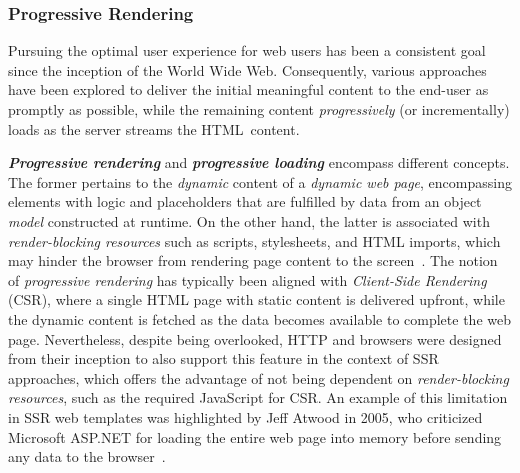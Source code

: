 \documentclass[software,article,accept,pdftex,moreauthors]{Definitions/mdpi}
\begin{document}
\subsubsection{Progressive Rendering}\label{s2.1.5}

Pursuing the optimal user experience for web users has been a consistent goal
since the inception of the World Wide Web. Consequently, various approaches
have been explored to deliver the initial meaningful content to the end-user as
promptly as possible, while the remaining content \textit{progressively} (or
incrementally) loads as the server streams the HTML~content.

\textit{\textbf{Progressive rendering}} and \textit{\textbf{progressive loading}}
encompass different concepts. The former pertains to the \textit{dynamic} content of a
\textit{dynamic web page}, encompassing elements with logic and placeholders
that are fulfilled by data from an object \textit{model} constructed at runtime.
On the other hand, the latter is associated with \textit{render-blocking
  resources} such as scripts, stylesheets, and HTML imports, which may hinder the
browser from rendering page content to the screen~\cite{progressive-2022}.
The notion of \textit{progressive rendering} has typically been aligned with
\textit{Client-Side Rendering} (CSR), where a single HTML page with static
content is delivered upfront, while the dynamic content is fetched as the data
becomes available to complete the web page.
Nevertheless, despite being overlooked, HTTP and browsers were designed from their
inception to also support this feature in the context of SSR approaches,
which offers the advantage of not being dependent on
\textit{render-blocking resources}, such as the required JavaScript for CSR.
An example of this limitation in SSR web templates was highlighted by Jeff
Atwood in 2005, who criticized Microsoft ASP.NET for loading the entire web
page into memory before sending any data to the browser~\cite{pssr2005}.
\end{document}
